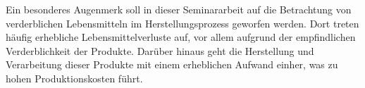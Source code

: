 Ein besonderes Augenmerk soll in dieser Seminararbeit auf die Betrachtung von verderblichen Lebensmitteln im Herstellungsprozess geworfen werden. Dort treten häufig erhebliche Lebensmittelverluste auf, vor allem aufgrund der empfindlichen Verderblichkeit der Produkte. Darüber hinaus geht die Herstellung und Verarbeitung dieser Produkte mit einem erheblichen Aufwand einher, was zu hohen Produktionskosten führt.
